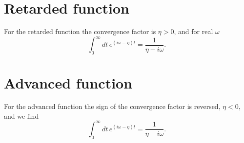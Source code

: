 \documentclass{article}
\begin{document}
\section{Retarded function}
For the retarded function the convergence factor is $\eta>0$, and for real $\omega$
\begin{equation}
\int_0^{\infty} dt\, e^{(i\omega-\eta)t} = \frac{1}{\eta-i\omega} .
\label{eq:ret}
\end{equation}
\section{Advanced function}
For the advanced function the sign of the convergence factor is reversed, $\eta<0$, and we find
\begin{equation}
\int_0^{\infty} dt\, e^{(i\omega-\eta)t} = \frac{1}{\eta-i\omega} .
\label{eq:adv}
\end{equation}
\end{document}
